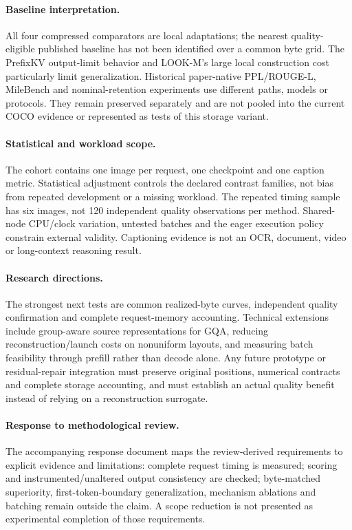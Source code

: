\paragraph{Baseline interpretation.}
All four compressed comparators are local adaptations; the nearest
quality-eligible published baseline has not been identified over a common
byte grid. The PrefixKV output-limit behavior and LOOK-M's large local
construction cost particularly limit generalization. Historical
paper-native PPL/ROUGE-L, MileBench and nominal-retention experiments use
different paths, models or protocols. They remain preserved separately
and are not pooled into the current COCO evidence or represented as tests
of this storage variant.

\paragraph{Statistical and workload scope.}
The cohort contains one image per request, one checkpoint and one caption
metric. Statistical adjustment controls the declared contrast families,
not bias from repeated development or a missing workload. The repeated
timing sample has six images, not 120 independent quality observations per
method. Shared-node CPU/clock variation, untested batches and the eager
execution policy constrain external validity. Captioning evidence is not
an OCR, document, video or long-context reasoning result.

\paragraph{Research directions.}
The strongest next tests are common realized-byte curves, independent
quality confirmation and complete request-memory accounting. Technical
extensions include group-aware source representations for GQA, reducing
reconstruction/launch costs on nonuniform layouts, and measuring batch
feasibility through prefill rather than decode alone. Any future prototype
or residual-repair integration must preserve original positions, numerical
contracts and complete storage accounting, and must establish an actual
quality benefit instead of relying on a reconstruction surrogate.

\paragraph{Response to methodological review.}
The accompanying response document maps the review-derived requirements
to explicit evidence and limitations: complete request timing is measured;
scoring and instrumented/unaltered output consistency are checked;
byte-matched superiority, first-token-boundary generalization, mechanism
ablations and batching remain outside the claim. A scope reduction is not
presented as experimental completion of those requirements.
